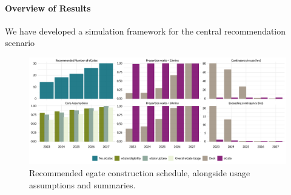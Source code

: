 \documentclass[10pt]{article}
\begin{document}
\paragraph{Overview of Results}
We have developed a simulation framework for  the central recommendation scenario 
\begin{figure}[!h]
    \centering
    \includegraphics[width=\textwidth]{figures/core_rec_fig.png}
     \caption{Recommended \gls{egate} construction schedule, alongside usage assumptions and  summaries.} \label{fig:core_rec_fig}
\end{figure}
\end{document}
